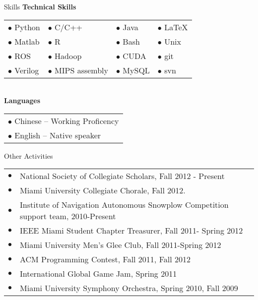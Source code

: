 \documentclass{resume} %
\begin{document}
\begin{rSection}{Skills}
  \textbf{Technical Skills}\\[1 mm]
  \begin{tabular}{llll}
     $\bullet$ Python   &  $\bullet$ C/C++         &  $\bullet$ Java   &   $\bullet$ \LaTeX\\
     $\bullet$ Matlab   &  $\bullet$ R             &  $\bullet$ Bash   &   $\bullet$ Unix \\ 
     $\bullet$ ROS      &  $\bullet$ Hadoop        &  $\bullet$ CUDA   &   $\bullet$ git\\
     $\bullet$ Verilog  &  $\bullet$ MIPS assembly &  $\bullet$ MySQL  &   $\bullet$ svn\\
  \end{tabular}\\[1 mm]
  \textbf{Languages}\\[1 mm]
  \begin{tabular}{l}
    $\bullet$ Chinese --  Working Proficency\\
    $\bullet$ English --  Native speaker
  \end{tabular}
\end{rSection}
\begin{rSection}{Other Activities}
  \begin{tabular}{ll}
    $\bullet$ & National Society of Collegiate Scholars, Fall 2012 - Present\\
    $\bullet$ & Miami University Collegiate Chorale, Fall 2012.\\
    $\bullet$ & Institute of Navigation Autonomous Snowplow Competition support team, 2010-Present\\
    $\bullet$ & IEEE Miami Student Chapter Treasurer, Fall 2011- Spring 2012\\
    $\bullet$ & Miami University Men’s Glee Club, Fall 2011-Spring 2012\\
    $\bullet$ & ACM Programming Contest, Fall 2011, Fall 2012\\
    $\bullet$ & International Global Game Jam, Spring 2011\\
    $\bullet$ & Miami University Symphony Orchestra, Spring 2010, Fall 2009\\
  \end{tabular}
\end{rSection}
\end{document}
